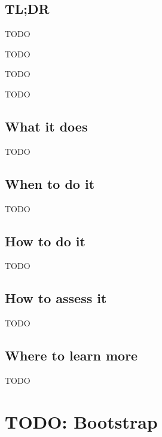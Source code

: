 \documentclass[
]{book}
\providecommand{\tightlist}{%
  \setlength{\itemsep}{0pt}\setlength{\parskip}{0pt}}
\begin{document}
\hypertarget{tldr-8}{%
\section{TL;DR}\label{tldr-8}}

\begin{description}
\tightlist
\item[What it does]
TODO
\item[When to do it]
TODO
\item[How to do it]
TODO
\item[How to assess it]
TODO
\end{description}

\hypertarget{what-it-does-8}{%
\section{What it does}\label{what-it-does-8}}

TODO

\hypertarget{when-to-do-it-8}{%
\section{When to do it}\label{when-to-do-it-8}}

TODO

\hypertarget{how-to-do-it-8}{%
\section{How to do it}\label{how-to-do-it-8}}

TODO

\hypertarget{how-to-assess-it-8}{%
\section{How to assess it}\label{how-to-assess-it-8}}

TODO

\hypertarget{where-to-learn-more-8}{%
\section{Where to learn more}\label{where-to-learn-more-8}}

TODO

\hypertarget{bootstrap}{%
\chapter{TODO: Bootstrap}\label{bootstrap}}
\end{document}
